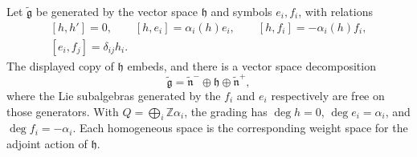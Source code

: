 \begin{proposition}
\label{res:KM03}
Let \(\widetilde{\mathfrak g}\) be generated by the vector space
\(\mathfrak h\) and symbols \(e_i,f_i\), with relations
\[
 \begin{gathered}
 [h,h']=0,\qquad [h,e_i]=\alpha_i(h)e_i,\qquad
 [h,f_i]=-\alpha_i(h)f_i,\\
 [e_i,f_j]=\delta_{ij}h_i .
 \end{gathered}
\]
The displayed copy of \(\mathfrak h\) embeds,
and there is a vector space decomposition
\[
 \widetilde{\mathfrak g}
   =\widetilde{\mathfrak n}^-\oplus\mathfrak h
      \oplus\widetilde{\mathfrak n}^+ ,
\]
where the Lie subalgebras generated by the \(f_i\) and \(e_i\)
respectively are free on those generators. With
\(Q=\bigoplus_i\mathbb Z\alpha_i\), the grading has
\(\deg h=0\), \(\deg e_i=\alpha_i\), and
\(\deg f_i=-\alpha_i\). Each homogeneous space is the
corresponding weight space for the adjoint action of \(\mathfrak h\).
\end{proposition}

